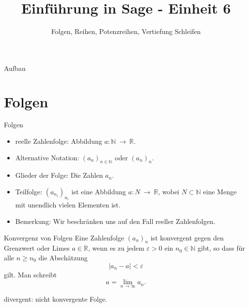 \documentclass[notes=hide,hyperref={dvipdfmx,pdfpagelabels=false}]{beamer}
\title{Einführung in Sage - Einheit 6}
\subtitle{Folgen, Reihen, Potenzreihen, Vertiefung Schleifen}
\begin{document}
\maketitle

\begin{frame}{Aufbau}
\tableofcontents
\end{frame}

\section{Folgen}

\begin{frame}{Folgen}
\begin{itemize}
\item {\color{red} reelle Zahlenfolge}: Abbildung $a:\mathbb{N} \ \rightarrow \ \mathbb{R}$.
\item Alternative Notation: $(a_n)_{n \in \mathbb{N}}$ oder $(a_n)_{n}$.
\item {\color{red} Glieder} der Folge: Die Zahlen $a_n$.
\item {\color{red} Teilfolge}: $(a_{n_i})_{n_i}$ ist eine Abbildung $a:N \
\rightarrow \ \mathbb{R}$, wobei $N \subset \mathbb{N}$ eine Menge mit
unendlich vielen Elementen ist.
\item Bemerkung: Wir beschränken uns auf den Fall reeller Zahlenfolgen. 
\end{itemize}
\end{frame}

\begin{frame}{Konvergenz von Folgen}
Eine Zahlenfolge $(a_n)_n$ ist {\color{red} konvergent} gegen den {\color{red}
Grenzwert} oder {\color{red} Limes} $a\in \mathbb{R}$, wenn es zu jedem
$\varepsilon >0$ ein $n_0 \in \mathbb{N}$ gibt, so dass für alle $n \geq
n_0$ die Abschätzung 
\[ |a_n - a|< \varepsilon \]
 gilt. Man schreibt
\[ a=\lim_{n \rightarrow \infty} a_n. \]

{\color{red} divergent}: nicht konvergente Folge. 
\end{frame}
\end{document}

